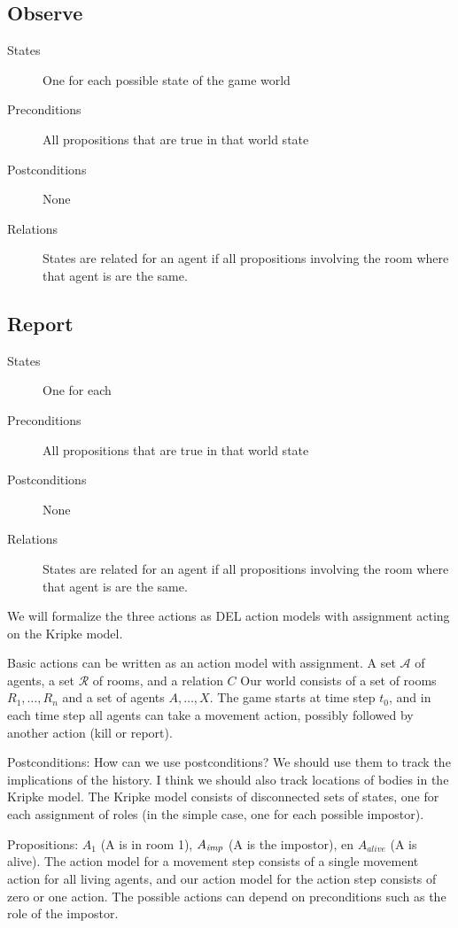 \documentclass[a4paper]{scrartcl}
\begin{document}
\subsection*{Observe}
\begin{description}
\item[States] One for each possible state of the game world
\item[Preconditions] All propositions that are true in that world state
\item[Postconditions] None
  
\item[Relations] States are related for an agent  if all propositions involving the room where that agent is are the same.
\end{description}
\subsection*{Report}
\begin{description}
\item[States] One for each 
\item[Preconditions] All propositions that are true in that world state
\item[Postconditions] None
  
\item[Relations] States are related for an agent  if all propositions involving the room where that agent is are the same.
\end{description}
We will formalize the three actions as DEL action models with assignment acting on the Kripke model. 

Basic actions can be written as an action model with assignment. 
A set $\mathcal{A}$ of agents, a set $\mathcal{R}$ of rooms, and a relation $C$
Our world consists of a set of rooms $R_1,  \dots,  R_n$ and a set of agents $A, \dots, X$. The game starts at time step $t_0$, and in each time step all agents can take a movement action, possibly followed by another action (kill or report).

Postconditions: How can we use postconditions? We should use them to track the implications of the history. I think we should also track locations of bodies in the Kripke model. The Kripke model consists of disconnected sets of states, one for each assignment of roles (in the simple case, one for each possible impostor).

Propositions: $A_1$ (A is in room 1), $A_{\emph{imp}}$ (A is the impostor), en $A_{alive}$ (A is alive). The action model for a movement step consists of a single movement action for all living agents, and our action model for the action step consists of zero or one action. The possible actions can depend on preconditions such as the role of the impostor. 
\end{document}
